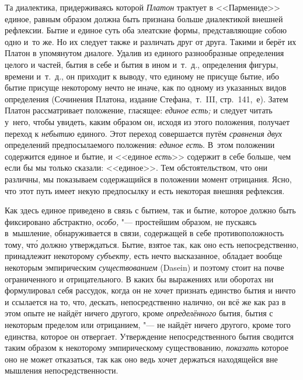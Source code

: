 Та диалектика, придерживаясь которой {\em Платон} трактует в <<Пармениде>>
единое, равным образом должна быть признана больше диалектикой внешней
рефлексии. Бытие и единое суть оба элеатские формы, представляющие собою одно
и~то же. Но их следует также и различать друг от друга. Такими и берёт их
Платон в упомянутом диалоге. Удалив из единого разнообразные определения целого
и частей, бытия в себе и бытия в ином и~т.~д., определения фигуры, времени
и~т.~д., он приходит к выводу, что единому не присуще бытие, ибо бытие присуще
некоторому нечто не иначе, как по одному из указанных видов определения
(Сочинения Платона, издание Стефана,~т.~III, стр.~141,~е). Затем Платон
рассматривает положение, гласящее: {\em единое} {\em есть;} и следует читать
у~него, чтобы увидеть, каким образом он, исходя из этого положения, получает
переход к {\em небытию} единого. Этот переход совершается путём {\em сравнения
двух} определений предпосылаемого положения: {\em единое есть}. В~этом
положении содержится единое и бытие, и <<единое {\em есть}>> содержит в себе
больше, чем если бы мы только сказали: <<единое>>. Тем обстоятельством, что они
различны, мы показываем содержащийся в положении момент отрицания. Ясно, что
этот путь имеет некую предпосылку и есть некоторая внешняя рефлексия.

Как здесь единое приведено в связь с бытием, так и бытие, которое должно быть
фиксировано абстрактно, {\em особо,} "--- простейшим образом, не пускаясь
в~мышление, обнаруживается в связи, содержащей в себе противоположность тому,
чт\'{о} должно утверждаться. Бытие, взятое так, как оно есть непосредственно,
принадлежит некоторому {\em субъекту,} есть нечто высказанное, обладает вообще
некоторым эмпирическим {\em существованием} (Dasein) и поэтому стоит на почве
ограниченного и отрицательного. В каких бы выражениях или оборотах ни
формулировал себя рассудок, когда он не хочет признать единство бытия и ничто и
ссылается на то, что, дескать, непосредственно налично, он всё же как раз в
этом опыте не найдёт ничего другого, кроме {\em определённого} бытия, бытия с
некоторым пределом или отрицанием, "--- не найдёт ничего другого, кроме того
единства, которое он отвергает. Утверждение непосредственного бытия сводится
таким образом к некоторому эмпирическому существованию, {\em показать} которое
оно не может отказаться, так как оно ведь хочет держаться находящейся вне
мышления непосредственности.

